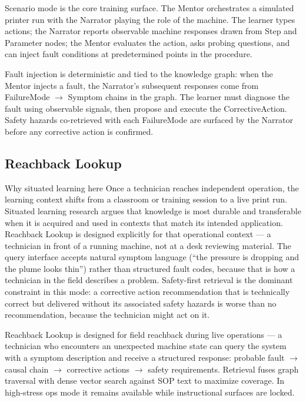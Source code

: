 \documentclass[11pt,letterpaper]{article}
\newcommand{\arrowto}{$\rightarrow$}
\begin{document}
Scenario mode is the core training surface. The Mentor orchestrates a simulated printer run with the Narrator playing the role of the machine. The learner types actions; the Narrator reports observable machine responses drawn from Step and Parameter nodes; the Mentor evaluates the action, asks probing questions, and can inject fault conditions at predetermined points in the procedure.

Fault injection is deterministic and tied to the knowledge graph: when the Mentor injects a fault, the Narrator's subsequent responses come from FailureMode \arrowto{} Symptom chains in the graph. The learner must diagnose the fault using observable signals, then propose and execute the CorrectiveAction. Safety hazards co-retrieved with each FailureMode are surfaced by the Narrator before any corrective action is confirmed.

\subsection{Reachback Lookup}
\label{sec:reachback-lookup}

\begin{rationale}{Why situated learning here}
Once a technician reaches independent operation, the learning context shifts from a classroom or training session to a live print run. Situated learning research argues that knowledge is most durable and transferable when it is acquired and used in contexts that match its intended application. Reachback Lookup is designed explicitly for that operational context --- a technician in front of a running machine, not at a desk reviewing material. The query interface accepts natural symptom language (``the pressure is dropping and the plume looks thin'') rather than structured fault codes, because that is how a technician in the field describes a problem. Safety-first retrieval is the dominant constraint in this mode: a corrective action recommendation that is technically correct but delivered without its associated safety hazards is worse than no recommendation, because the technician might act on it.
\end{rationale}

Reachback Lookup is designed for field reachback during live operations --- a technician who encounters an unexpected machine state can query the system with a symptom description and receive a structured response: probable fault \arrowto{} causal chain \arrowto{} corrective actions \arrowto{} safety requirements. Retrieval fuses graph traversal with dense vector search against SOP text to maximize coverage. In high-stress ops mode it remains available while instructional surfaces are locked.
\end{document}
